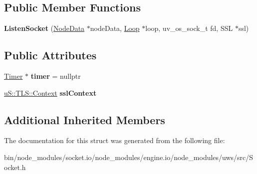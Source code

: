 \subsection*{Public Member Functions}
\begin{DoxyCompactItemize}
\item 
\mbox{\label{structu_s_1_1_listen_socket_afd8674fc7736330b555c67084bd0f6c5}} 
{\bfseries Listen\+Socket} (\mbox{\hyperlink{structu_s_1_1_node_data}{Node\+Data}} $\ast$node\+Data, \mbox{\hyperlink{struct_loop}{Loop}} $\ast$loop, uv\+\_\+os\+\_\+sock\+\_\+t fd, S\+SL $\ast$ssl)
\end{DoxyCompactItemize}
\subsection*{Public Attributes}
\begin{DoxyCompactItemize}
\item 
\mbox{\label{structu_s_1_1_listen_socket_ad27258cd4d8fdd6140899739b7bafe8f}} 
\mbox{\hyperlink{struct_timer}{Timer}} $\ast$ {\bfseries timer} = nullptr
\item 
\mbox{\label{structu_s_1_1_listen_socket_a32a3130d9f30f4071eb7d61a6bfa6708}} 
\mbox{\hyperlink{classu_s_1_1_t_l_s_1_1_context}{u\+S\+::\+T\+L\+S\+::\+Context}} {\bfseries ssl\+Context}
\end{DoxyCompactItemize}
\subsection*{Additional Inherited Members}


The documentation for this struct was generated from the following file\+:\begin{DoxyCompactItemize}
\item 
bin/node\+\_\+modules/socket.\+io/node\+\_\+modules/engine.\+io/node\+\_\+modules/uws/src/Socket.\+h\end{DoxyCompactItemize}
